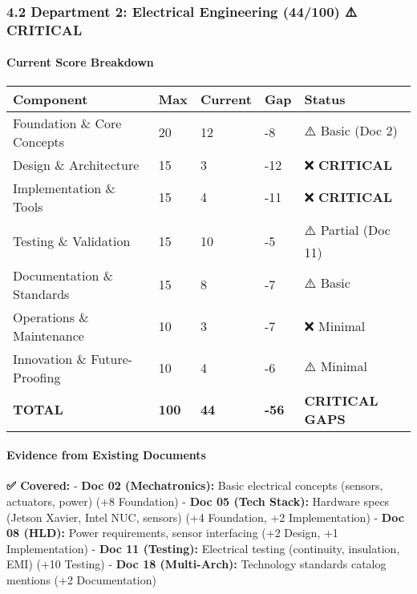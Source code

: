 \documentclass[
]{article}
\begin{document}
\hypertarget{department-2-electrical-engineering-44100-critical}{%
\subsubsection{4.2 Department 2: Electrical Engineering (44/100) ⚠️
CRITICAL}\label{department-2-electrical-engineering-44100-critical}}

\hypertarget{current-score-breakdown-1}{%
\paragraph{Current Score Breakdown}\label{current-score-breakdown-1}}

\begin{longtable}[]{@{}lllll@{}}
\toprule\noalign{}
Component & Max & Current & Gap & Status \\
\midrule\noalign{}
\endhead
\bottomrule\noalign{}
\endlastfoot
Foundation \& Core Concepts & 20 & 12 & -8 & ⚠️ Basic (Doc 2) \\
Design \& Architecture & 15 & 3 & -12 & ❌ \textbf{CRITICAL} \\
Implementation \& Tools & 15 & 4 & -11 & ❌ \textbf{CRITICAL} \\
Testing \& Validation & 15 & 10 & -5 & ⚠️ Partial (Doc 11) \\
Documentation \& Standards & 15 & 8 & -7 & ⚠️ Basic \\
Operations \& Maintenance & 10 & 3 & -7 & ❌ Minimal \\
Innovation \& Future-Proofing & 10 & 4 & -6 & ⚠️ Minimal \\
\textbf{TOTAL} & \textbf{100} & \textbf{44} & \textbf{-56} &
\textbf{CRITICAL GAPS} \\
\end{longtable}

\hypertarget{evidence-from-existing-documents-1}{%
\paragraph{Evidence from Existing
Documents}\label{evidence-from-existing-documents-1}}

\textbf{✅ Covered:} - \textbf{Doc 02 (Mechatronics):} Basic electrical
concepts (sensors, actuators, power) (+8 Foundation) - \textbf{Doc 05
(Tech Stack):} Hardware specs (Jetson Xavier, Intel NUC, sensors) (+4
Foundation, +2 Implementation) - \textbf{Doc 08 (HLD):} Power
requirements, sensor interfacing (+2 Design, +1 Implementation) -
\textbf{Doc 11 (Testing):} Electrical testing (continuity, insulation,
EMI) (+10 Testing) - \textbf{Doc 18 (Multi-Arch):} Technology standards
catalog mentions (+2 Documentation)
\end{document}
